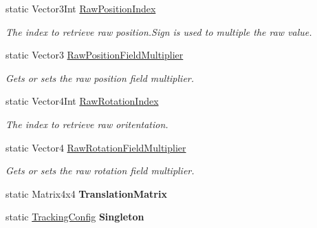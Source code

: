 \begin{DoxyCompactItemize}
static Vector3\+Int \mbox{\hyperlink{class_ximmerse_1_1_slide_in_s_d_k_1_1_tracking_config_a7950e6cbcfa9bfcd2dfa2121cd728f01}{Raw\+Position\+Index}}
\begin{DoxyCompactList}\small\item\em The index to retrieve raw position.\+Sign is used to multiple the raw value. \end{DoxyCompactList}\item 
static Vector3 \mbox{\hyperlink{class_ximmerse_1_1_slide_in_s_d_k_1_1_tracking_config_a5c1c9f7f074d86c5256bacbb3ae15b31}{Raw\+Position\+Field\+Multiplier}}
\begin{DoxyCompactList}\small\item\em Gets or sets the raw position field multiplier. \end{DoxyCompactList}\item 
static Vector4\+Int \mbox{\hyperlink{class_ximmerse_1_1_slide_in_s_d_k_1_1_tracking_config_aa2fef547bc74d9523ca95af8bc2ffb43}{Raw\+Rotation\+Index}}
\begin{DoxyCompactList}\small\item\em The index to retrieve raw oritentation. \end{DoxyCompactList}\item 
static Vector4 \mbox{\hyperlink{class_ximmerse_1_1_slide_in_s_d_k_1_1_tracking_config_ac5f05204ec0d2b085baf1bb1fe1f8636}{Raw\+Rotation\+Field\+Multiplier}}
\begin{DoxyCompactList}\small\item\em Gets or sets the raw rotation field multiplier. \end{DoxyCompactList}\item 
\mbox{\label{class_ximmerse_1_1_slide_in_s_d_k_1_1_tracking_config_aa3b597f1a9e7846183ded992e7f3b3b4}} 
static Matrix4x4 {\bfseries Translation\+Matrix}
\item 
\mbox{\label{class_ximmerse_1_1_slide_in_s_d_k_1_1_tracking_config_a9ac3609612556ff1ba9d49db8cd60f2d}} 
static \mbox{\hyperlink{class_ximmerse_1_1_slide_in_s_d_k_1_1_tracking_config}{Tracking\+Config}} {\bfseries Singleton}
\end{DoxyCompactItemize}



